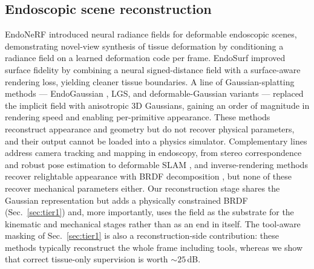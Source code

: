 \documentclass[review]{elsarticle}
\begin{document}
\subsection{Endoscopic scene reconstruction}
EndoNeRF \citep{endonerf} introduced neural radiance fields \citep{nerf}
for deformable endoscopic scenes, demonstrating novel-view synthesis of
tissue deformation by conditioning a radiance field on a learned
deformation code per frame. EndoSurf \citep{endosurf} improved surface
fidelity by combining a neural signed-distance field with a surface-aware
rendering loss, yielding cleaner tissue boundaries. A line of
Gaussian-splatting methods \citep{gaussiansplatting} --- EndoGaussian
\citep{endogaussian}, LGS, and deformable-Gaussian variants --- replaced
the implicit field with anisotropic 3D Gaussians, gaining an order of
magnitude in rendering speed and enabling per-primitive appearance. These
methods reconstruct appearance and geometry but do not recover physical
parameters, and their output cannot be loaded into a physics simulator.
Complementary lines address camera tracking and mapping in endoscopy, from
stereo correspondence \citep{allan2021} and robust pose estimation
\citep{hayoz2023} to deformable SLAM \citep{defslam}, and inverse-rendering
methods recover relightable appearance with BRDF decomposition
\citep{gsir2024,relightable3dgs}, but none of these recover mechanical
parameters either. Our reconstruction stage shares the Gaussian representation but adds a
physically constrained BRDF (Sec.~\ref{sec:tier1}) and, more importantly,
uses the field as the substrate for the kinematic and mechanical stages
rather than as an end in itself. The tool-aware masking of
Sec.~\ref{sec:tier1} is also a reconstruction-side contribution: these
methods typically reconstruct the whole frame including tools, whereas we
show that correct tissue-only supervision is worth ${\sim}25$\,dB.
\end{document}
